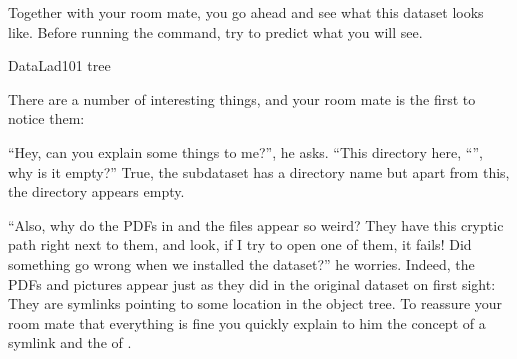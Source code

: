 \sphinxAtStartPar
Together with your room mate, you go ahead and see what this dataset looks
like. Before running the command, try to predict what you will see.

\begin{sphinxVerbatim}[commandchars=\\\{\}]
DataLad\PYGZhy{}101
tree

\end{sphinxVerbatim}

\sphinxAtStartPar
There are a number of interesting things, and your room mate is the
first to notice them:

\sphinxAtStartPar
“Hey, can you explain some things to me?”, he asks. “This directory
here, “”, why is it empty?”
True, the subdataset has a directory name but apart from this,
the  directory appears empty.

\sphinxAtStartPar
“Also, why do the PDFs in  and the  files
appear so weird? They have
this cryptic path right next to them, and look, if I try to open
one of them, it fails! Did something go wrong when we installed
the dataset?” he worries.
Indeed, the PDFs and pictures appear just as they did in the original dataset
on first sight: They are symlinks pointing to some location in the
object tree. To reassure your room mate that everything is fine you
quickly explain to him the concept of a symlink and the {\hyperref[\detokenize{glossary:term-object-tree}]{}}
of {\hyperref[\detokenize{glossary:term-git-annex}]{}}.

